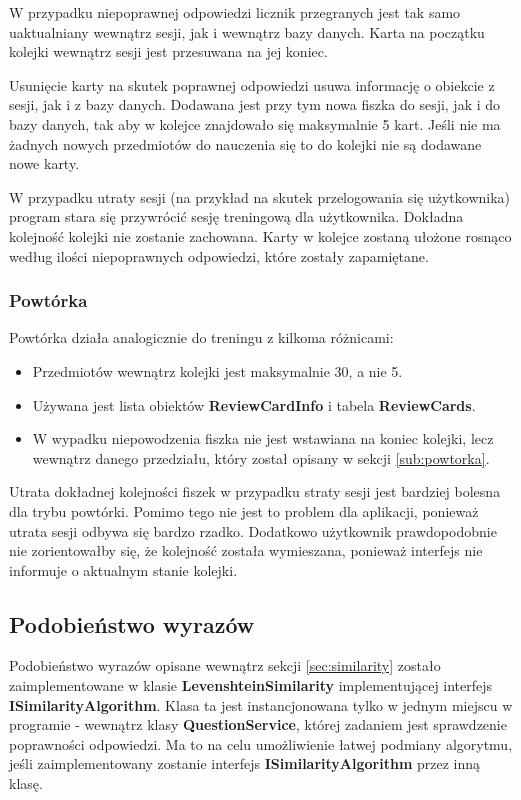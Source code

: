 W przypadku niepoprawnej odpowiedzi licznik przegranych jest tak samo uaktualniany wewnątrz sesji, jak i wewnątrz bazy danych. Karta na początku kolejki wewnątrz sesji jest przesuwana na jej koniec.

Usunięcie karty na skutek poprawnej odpowiedzi usuwa informację o obiekcie z sesji, jak i z bazy danych. Dodawana jest przy tym nowa fiszka do sesji, jak i do bazy danych, tak aby w kolejce znajdowało się maksymalnie 5 kart. Jeśli nie ma żadnych nowych przedmiotów do nauczenia się to do kolejki nie są dodawane nowe karty.

W przypadku utraty sesji (na przykład na skutek przelogowania się użytkownika) program stara się przywrócić sesję treningową dla użytkownika. Dokładna kolejność kolejki nie zostanie zachowana. Karty w kolejce zostaną ułożone rosnąco według ilości niepoprawnych odpowiedzi, które zostały zapamiętane.

\subsubsection{Powtórka}

Powtórka działa analogicznie do treningu z kilkoma różnicami:

\begin{itemize}
	\item Przedmiotów wewnątrz kolejki jest maksymalnie 30, a nie 5.
	\item Używana jest lista obiektów \textbf{ReviewCardInfo} i tabela \textbf{ReviewCards}.
	\item W wypadku niepowodzenia fiszka nie jest wstawiana na koniec kolejki, lecz wewnątrz danego przedziału, który został opisany w sekcji \ref{sub:powtorka}.
\end{itemize}

Utrata dokładnej kolejności fiszek w przypadku straty sesji jest bardziej bolesna dla trybu powtórki. Pomimo tego nie jest to problem dla aplikacji, ponieważ utrata sesji odbywa się bardzo rzadko. Dodatkowo użytkownik prawdopodobnie nie zorientowałby się, że kolejność została wymieszana, ponieważ interfejs nie informuje o aktualnym stanie kolejki.

\subsection{Podobieństwo wyrazów}

Podobieństwo wyrazów opisane wewnątrz sekcji \ref{sec:similarity} zostało zaimplementowane w klasie \textbf{LevenshteinSimilarity} implementującej interfejs \textbf{ISimilarityAlgorithm}. Klasa ta jest instancjonowana tylko w jednym miejscu w programie - wewnątrz klasy \textbf{QuestionService}, której zadaniem jest sprawdzenie poprawności odpowiedzi. Ma to na celu umożliwienie łatwej podmiany algorytmu, jeśli zaimplementowany zostanie interfejs \textbf{ISimilarityAlgorithm} przez inną klasę.

